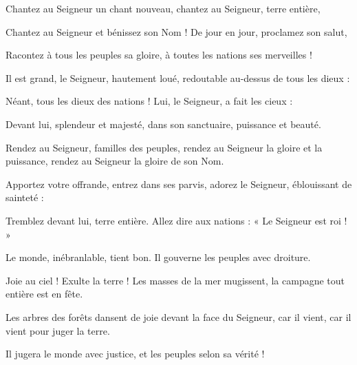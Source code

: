 \item Chantez au Seigneur un chant nouveau, chantez au Seigneur, terre entière,
\item Chantez au Seigneur et bénissez son Nom ! De jour en jour, proclamez son salut,
\item Racontez à tous les peuples sa gloire, à toutes les nations ses merveilles !
\item Il est grand, le Seigneur, hautement loué, redoutable au-dessus de tous les dieux :
\item Néant, tous les dieux des nations ! Lui, le Seigneur, a fait les cieux :
\item Devant lui, splendeur et majesté, dans son sanctuaire, puissance et beauté.
\item Rendez au Seigneur, familles des peuples, rendez au Seigneur la gloire et la puissance, rendez au Seigneur la gloire de son Nom. 
\item Apportez votre offrande, entrez dans ses parvis, adorez le Seigneur, éblouissant de sainteté : 
\item Tremblez devant lui, terre entière. Allez dire aux nations : « Le Seigneur est roi ! » 
\item Le monde, inébranlable, tient bon. Il gouverne les peuples avec droiture.
\item Joie au ciel ! Exulte la terre ! Les masses de la mer mugissent, la campagne tout entière est en fête. 
\item Les arbres des forêts dansent de joie devant la face du Seigneur, car il vient, car il vient pour juger la terre. 
\item Il jugera le monde avec justice, et les peuples selon sa vérité !
